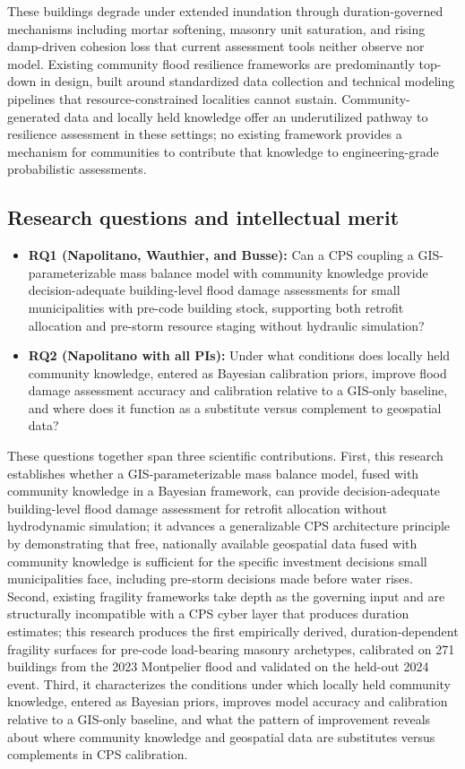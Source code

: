 \documentclass[11pt]{article}
\begin{document}
These buildings degrade under extended inundation through duration-governed mechanisms
including mortar softening, masonry unit saturation, and rising damp-driven cohesion
loss that current assessment tools neither observe nor model.
Existing community flood resilience frameworks are predominantly top-down in design,
built around standardized data collection and technical modeling pipelines that
resource-constrained localities cannot sustain.
Community-generated data and locally held knowledge offer an underutilized pathway
to resilience assessment in these settings; no existing framework provides a
mechanism for communities to contribute that knowledge to engineering-grade
probabilistic assessments.

\vspace{-10pt}
\subsection{Research questions and intellectual merit}

\begin{itemize}[leftmargin=1.5em,itemsep=0pt]
\item \textbf{RQ1 (Napolitano, Wauthier, and Busse):} Can a CPS coupling a
GIS-parameterizable mass balance model with community knowledge provide
decision-adequate building-level flood damage assessments for small municipalities
with pre-code building stock, supporting both retrofit allocation and pre-storm
resource staging without hydraulic simulation?
\item \textbf{RQ2 (Napolitano with all PIs):} Under what conditions does locally
held community knowledge, entered as Bayesian calibration priors, improve flood
damage assessment accuracy and calibration relative to a GIS-only baseline, and
where does it function as a substitute versus complement to geospatial data?
\end{itemize}

These questions together span three scientific contributions.
First, this research establishes whether a GIS-parameterizable mass balance model,
fused with community knowledge in a Bayesian framework, can provide decision-adequate
building-level flood damage assessment for retrofit allocation without hydrodynamic
simulation; it advances a generalizable CPS architecture principle by demonstrating
that free, nationally available geospatial data fused with community knowledge is
sufficient for the specific investment decisions small municipalities face, including
pre-storm decisions made before water rises.
Second, existing fragility frameworks take depth as the governing input and are
structurally incompatible with a CPS cyber layer that produces duration estimates;
this research produces the first empirically derived, duration-dependent fragility
surfaces for pre-code load-bearing masonry archetypes, calibrated on 271 buildings
from the 2023 Montpelier flood and validated on the held-out 2024 event.
Third, it characterizes the conditions under which locally held community knowledge,
entered as Bayesian priors, improves model accuracy and calibration relative to a
GIS-only baseline, and what the pattern of improvement reveals about where community
knowledge and geospatial data are substitutes versus complements in CPS calibration.
\end{document}
